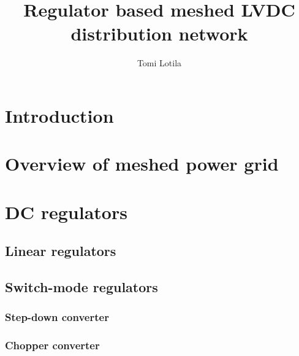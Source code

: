 \documentclass{report}
\begin{document}
\title{Regulator based meshed LVDC distribution network}
\author{Tomi Lotila}
\maketitle

\tableofcontents


\listoffigures

\chapter{Introduction}


\chapter{Overview of meshed power grid}


\chapter{DC regulators}

\section{Linear regulators} 
\section{Switch-mode regulators} 
\subsection{Step-down converter} 
\subsection{Chopper converter} 
\end{document}
